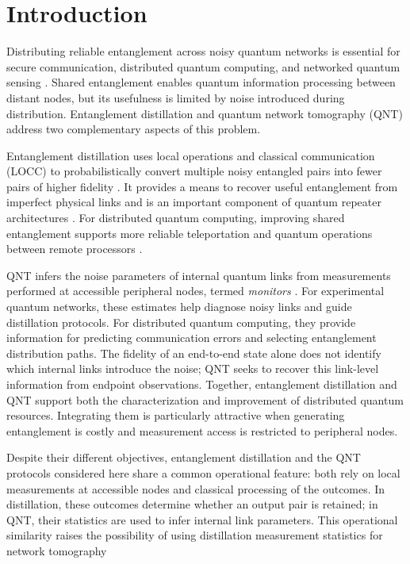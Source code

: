 \section{Introduction}
\label{sec:introduction}

Distributing reliable entanglement across noisy quantum networks
is essential for secure communication, distributed quantum
computing, and networked quantum sensing
\cite{Wehner2018QuantumInternet}.
Shared entanglement enables quantum information processing
between distant nodes, but its usefulness is limited by noise
introduced during distribution.
Entanglement distillation and quantum network tomography (QNT)
address two complementary aspects of this problem.

Entanglement distillation uses local operations and classical
communication (LOCC) to probabilistically
 convert multiple noisy entangled pairs
into fewer pairs of higher fidelity   
\cite{PhysRevLett.76.722,Deutsch_1996}.
It provides a means to recover useful entanglement from imperfect
physical links and is an important component of quantum repeater
architectures \cite{Briegel1998Repeaters}.
For distributed quantum computing, improving shared entanglement
supports more reliable teleportation and quantum operations
between remote processors \cite{Wehner2018QuantumInternet}.

QNT infers the noise parameters of internal quantum links from
measurements performed at accessible peripheral nodes, termed
\emph{monitors} \cite{Andrade2024QNT}.
For experimental quantum networks, these estimates help diagnose
noisy links and guide distillation protocols.
For distributed quantum computing, they provide information for
predicting communication errors and selecting entanglement
distribution paths. The fidelity of an end-to-end state alone does not identify
which internal links introduce the noise; QNT seeks to recover
this link-level information from endpoint observations.
Together, entanglement distillation and QNT support
both the characterization and improvement of distributed quantum resources. Integrating them is particularly attractive when
generating entanglement is costly and measurement access is
restricted to peripheral nodes.

Despite their different objectives, entanglement distillation
and the QNT protocols considered here share a common operational feature: both rely on local measurements at accessible
nodes and classical processing of the outcomes. In distillation,
these outcomes determine whether an output pair is retained; in
QNT, their statistics are used to infer internal link parameters.
This operational similarity raises the possibility of using
distillation measurement statistics for network tomography









